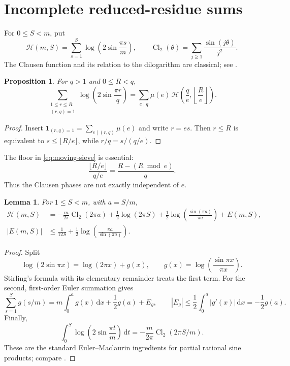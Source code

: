 \documentclass[11pt]{amsart}
\numberwithin{equation}{section}
\newtheorem{proposition}[theorem]{Proposition}
\newtheorem{lemma}[theorem]{Lemma}
\theoremstyle{definition}
\theoremstyle{remark}
\newcommand{\dd}{\,\mathrm d}
\begin{document}
\section{Incomplete reduced-residue sums}
\label{sec:clausen}

For \(0\leq S<m\), put
\begin{equation}\label{eq:Hpartial}
 \mathcal H(m,S)=\sum_{s=1}^{S}
 \log\!\left(2\sin\frac{\pi s}{m}\right),
 \qquad
 \operatorname{Cl}_2(\theta)=\sum_{j\geq1}\frac{\sin(j\theta)}{j^2}.
\end{equation}
The Clausen function and its relation to the dilogarithm are classical;
see \cite{Lewin1981}.

\begin{proposition}\label{prop:moving-sieve}
For \(q>1\) and \(0\leq R<q\),
\begin{equation}\label{eq:moving-sieve}
 \sum_{\substack{1\leq r\leq R\\(r,q)=1}}
 \log\!\left(2\sin\frac{\pi r}{q}\right)
 =\sum_{e\mid q}\mu(e)\,
 \mathcal H\!\left(\frac qe,\left\lfloor\frac Re\right\rfloor\right).
\end{equation}
\end{proposition}

\begin{proof}
Insert \(\mathbf1_{(r,q)=1}=\sum_{e\mid(r,q)}\mu(e)\) and write
\(r=es\).  Then \(r\leq R\) is equivalent to
\(s\leq\lfloor R/e\rfloor\), while \(r/q=s/(q/e)\).
\end{proof}

The floor in \eqref{eq:moving-sieve} is essential:
\begin{equation}\label{eq:floor-phase}
 \frac{\lfloor R/e\rfloor}{q/e}
 =\frac{R-(R\bmod e)}q.
\end{equation}
Thus the Clausen phases are not exactly independent of \(e\).

\begin{lemma}\label{lem:partial-sine}
For \(1\leq S<m\), with \(a=S/m\),
\begin{align}
 \mathcal H(m,S)
 &=-\frac{m}{2\pi}\operatorname{Cl}_2(2\pi a)
 +\frac12\log(2\pi S)
 +\frac12\log\!\left(\frac{\sin(\pi a)}{\pi a}\right)
 +E(m,S),\label{eq:partial-sine}\\
 |E(m,S)|
 &\leq\frac1{12S}
 +\frac12\log\!\left(\frac{\pi a}{\sin(\pi a)}\right).
 \label{eq:partial-sine-error}
\end{align}
\end{lemma}

\begin{proof}
Split
\[
 \log(2\sin\pi x)=\log(2\pi x)
 +g(x),\qquad g(x)=\log\!\left(\frac{\sin\pi x}{\pi x}\right).
\]
Stirling's formula with its elementary remainder treats the first term.
For the second, first-order Euler summation gives
\[
 \sum_{s=1}^{S}g(s/m)
 =m\int_0^ag(x)\dd x+\frac12g(a)+E_g,
 \qquad |E_g|\leq\frac12\int_0^a|g'(x)|\dd x=-\frac12g(a).
\]
Finally,
\[
 \int_0^S\log\!\left(2\sin\frac{\pi t}{m}\right)\dd t
 =-\frac{m}{2\pi}\operatorname{Cl}_2(2\pi S/m).
\]
These are the standard Euler--Maclaurin ingredients for partial rational
sine products; compare \cite{OSullivan2016}.
\end{proof}
\end{document}
